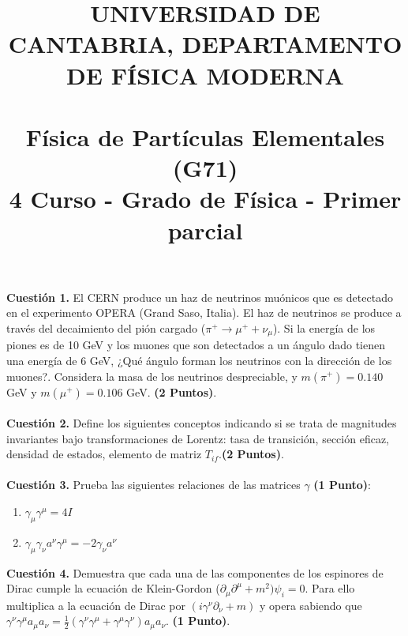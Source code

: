 \documentclass[paper=a4, fontsize=11pt]{scrartcl} %
\date{}
\title{	
\normalfont \normalsize 
\textsc{UNIVERSIDAD DE CANTABRIA, DEPARTAMENTO DE FÍSICA MODERNA} \\ [20pt] %
\horrule{0.5pt} \\[0.4cm] %
\huge Física de Partículas Elementales (G71) \\ %
\normalsize 4 Curso - Grado de Física - Primer parcial
\horrule{2pt} \\[0.5cm] %
}
\numberwithin{equation}{section} %
\numberwithin{figure}{section} %
\numberwithin{table}{section} %
\begin{document}
\maketitle %

\vspace{-2.5cm}

\textbf{Cuestión 1.} El CERN produce un haz de neutrinos muónicos que es detectado en el experimento OPERA (Grand Saso, Italia). El haz de neutrinos 
se produce a través del decaimiento del pión cargado ($\pi^{+}\rightarrow\mu^{+}+\nu_\mu$). Si la energía de los piones es de 10 GeV y los muones 
que son detectados a un ángulo dado tienen una energía de 6 GeV, ¿Qué ángulo forman los neutrinos con la dirección de los muones?. Considera la masa
de los neutrinos despreciable, y $m(\pi^{+})=0.140$ GeV y $m(\mu^{+})=0.106$ GeV. \textbf{(2 Puntos)}.
\\
\\
\textbf{Cuestión 2.} Define los siguientes conceptos indicando si se trata de magnitudes invariantes bajo transformaciones de Lorentz: tasa de transición,
sección eficaz, densidad de estados, elemento de matriz $T_{if}$.\textbf{(2 Puntos)}.
\\
\\
\textbf{Cuestión 3.} Prueba las siguientes relaciones de las matrices $\gamma$ \textbf{(1 Punto)}: 
\begin{enumerate}
\item $\gamma_\mu\gamma^\mu=4I$
\item $\gamma_\mu\gamma_\nu a^{\nu}\gamma^{\mu}=-2\gamma_\nu a^{\nu}$
\end{enumerate}
\textbf{Cuestión 4.} Demuestra que cada una de las componentes de los espinores de Dirac cumple la ecuación de Klein-Gordon ($\partial_\mu\partial^{\mu} + m^2)\psi_i = 0$. Para ello multiplica a la ecuación de Dirac por $(i\gamma^{\nu}\partial_{\nu} + m)$ y opera sabiendo que $\gamma^{\nu}\gamma^{\mu}a_{\mu}a_{\nu}=\frac{1}{2}(\gamma^{\nu}\gamma^{\mu} + \gamma^{\mu}\gamma^{\nu})a_{\mu}a_{\nu}$. \textbf{(1 Punto)}.
\end{document}
